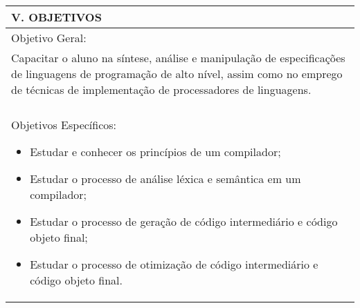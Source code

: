 \documentclass[12pt]{article}
\begin{document}
\begin{longtable}{|L{1.025\textwidth}|} \hline
%
{\bf V. OBJETIVOS } \\ \hline
Objetivo Geral:\\

Capacitar o aluno na síntese, análise e manipulação de especificações de linguagens de programação de alto nível, assim como no emprego de técnicas de implementação de processadores de linguagens.\\
\\
Objetivos Específicos:
\begin{itemize}
\item Estudar e conhecer os princípios de um compilador;
\item Estudar o processo de análise léxica e semântica em um compilador;
\item Estudar o processo de geração de código intermediário e código objeto final;
\item Estudar o processo de otimização de código intermediário e código objeto final.
\end{itemize}
\\ \hline
\end{longtable}
\end{document}

